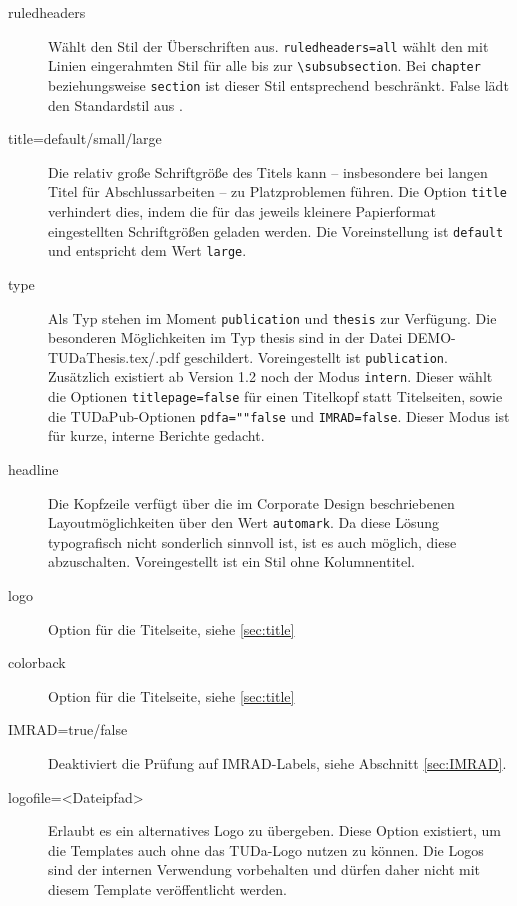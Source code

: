 \documentclass[
	german,%
	accentcolor=9c,%
]{tudapub}
\newcommand*{\code}[1]{\texttt{#1}}
\begin{document}
\begin{description}
	\item[ruledheaders] Wählt den Stil der Überschriften aus. \code{ruledheaders=all} wählt den mit Linien eingerahmten Stil für alle bis zur \verb+\subsubsection+. Bei \code{chapter} beziehungsweise \code{section} ist dieser Stil entsprechend beschränkt. False lädt den Standardstil aus \KOMAScript.

	\item[title=default/small/large] Die relativ große Schriftgröße des Titels kann – insbesondere bei langen Titel für Abschlussarbeiten – zu Platzproblemen führen. Die Option \code{title} verhindert dies, indem die für das jeweils kleinere Papierformat eingestellten Schriftgrößen geladen werden. Die Voreinstellung ist \code{default} und entspricht dem Wert \code{large}.

	\item[type] Als Typ stehen im Moment \code{publication} und \code{thesis} zur Verfügung. Die besonderen Möglichkeiten im Typ thesis sind in der Datei DEMO-TUDaThesis.tex/.pdf geschildert. Voreingestellt ist \code{publication}.
	      Zusätzlich existiert ab Version 1.2 noch der Modus \code{intern}. Dieser wählt die Optionen \code{titlepage=false} für einen Titelkopf statt Titelseiten, sowie die TUDaPub-Optionen \code{pdfa=""false} und \code{IMRAD=false}. Dieser Modus ist für kurze, interne Berichte gedacht.

	\item[headline] Die Kopfzeile verfügt über die im Corporate Design beschriebenen Layoutmöglichkeiten über den Wert \code{automark}. Da diese Lösung typografisch nicht sonderlich sinnvoll ist, ist es auch möglich, diese abzuschalten. Voreingestellt ist ein Stil ohne Kolumnentitel.

	\item[logo] Option für die Titelseite, siehe \ref{sec:title}

	\item[colorback] Option für die Titelseite, siehe \ref{sec:title}

	\item[IMRAD=true/false] Deaktiviert die Prüfung auf IMRAD-Labels, siehe Abschnitt \ref{sec:IMRAD}.

	\item[logofile=<Dateipfad>] Erlaubt es ein alternatives Logo zu übergeben. Diese Option existiert, um die Templates auch ohne das TUDa-Logo nutzen zu können. Die Logos sind der internen Verwendung vorbehalten und dürfen daher nicht mit diesem Template veröffentlicht werden.
\end{description}
\end{document}

